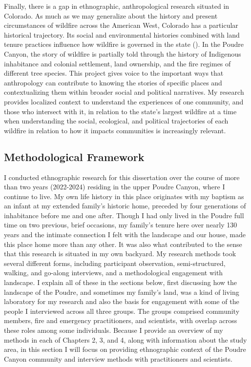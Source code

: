 \documentclass[
]{article}
\begin{document}
Finally, there is a gap in ethnographic, anthropological research situated in Colorado. As much as we may generalize about the history and present circumstances of wildfire across the American West, Colorado has a particular historical trajectory. Its social and environmental histories combined with land tenure practices influence how wildfire is governed in the state (). In the Poudre Canyon, the story of wildfire is partially told through the history of Indigenous inhabitance and colonial settlement, land ownership, and the fire regimes of different tree species. This project gives voice to the important ways that anthropology can contribute to knowing the stories of specific places and contextualizing them within broader social and political narratives. My research provides localized context to understand the experiences of one community, and those who intersect with it, in relation to the state's largest wildfire at a time when understanding the social, ecological, and political trajectories of each wildfire in relation to how it impacts communities is increasingly relevant.

\subsection{Methodological Framework}\label{methodological-framework}

I conducted ethnographic research for this dissertation over the course of more than two years (2022-2024) residing in the upper Poudre Canyon, where I continue to live. My own life history in this place originates with my baptism as an infant at my extended family's historic home, preceded by four generations of inhabitance before me and one after. Though I had only lived in the Poudre full time on two previous, brief occasions, my family's tenure here over nearly 130 years and the intimate connection I felt with the landscape and our house, made this place home more than any other. It was also what contributed to the sense that this research is situated in my own backyard. My research methods took several different forms, including participant observation, semi-structured, walking, and go-along interviews, and a methodological engagement with landscape. I explain all of these in the sections below, first discussing how the landscape of the Poudre, and sometimes my family's land, was a kind of living laboratory for my research and also the basis for engagement with some of the people I interviewed across all three groups. The groups comprised community members, fire and emergency practitioners, and scientists, with overlap across these roles among some individuals. Because I provide an overview of my methods in each of Chapters 2, 3, and 4, along with information about the study area, in this section I will focus on providing ethnographic context of the Poudre Canyon community and interview methods with practitioners and scientists.
\end{document}
